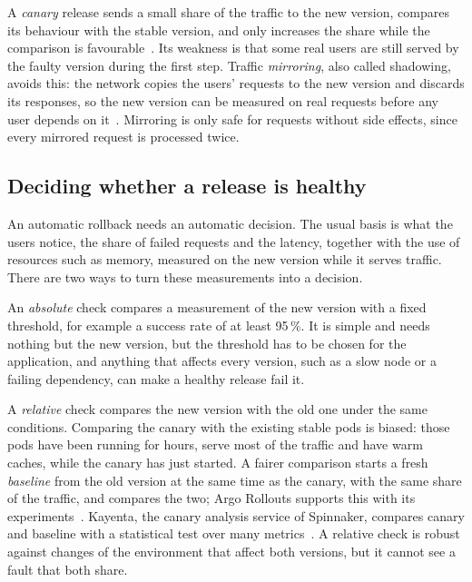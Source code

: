 A \emph{canary} release sends a small share of the traffic to the new version, compares its behaviour with the stable version, and only increases the share while the comparison is favourable~\cite{SREWorkbook}. Its weakness is that some real users are still served by the faulty version during the first step. Traffic \emph{mirroring}, also called shadowing, avoids this: the network copies the users' requests to the new version and discards its responses, so the new version can be measured on real requests before any user depends on it~\cite{IstioMirroring}. Mirroring is only safe for requests without side effects, since every mirrored request is processed twice.

\subsection{Deciding whether a release is healthy}
\label{sec:BgAnalysis}
An automatic rollback needs an automatic decision. The usual basis is what the users notice, the share of failed requests and the latency, together with the use of resources such as memory, measured on the new version while it serves traffic. There are two ways to turn these measurements into a decision.

An \emph{absolute} check compares a measurement of the new version with a fixed threshold, for example a success rate of at least 95\,\%. It is simple and needs nothing but the new version, but the threshold has to be chosen for the application, and anything that affects every version, such as a slow node or a failing dependency, can make a healthy release fail it.

A \emph{relative} check compares the new version with the old one under the same conditions. Comparing the canary with the existing stable pods is biased: those pods have been running for hours, serve most of the traffic and have warm caches, while the canary has just started. A fairer comparison starts a fresh \emph{baseline} from the old version at the same time as the canary, with the same share of the traffic, and compares the two; Argo Rollouts supports this with its experiments~\cite{ArgoRolloutsExperiment}. Kayenta, the canary analysis service of Spinnaker, compares canary and baseline with a statistical test over many metrics~\cite{Kayenta}. A relative check is robust against changes of the environment that affect both versions, but it cannot see a fault that both share.


